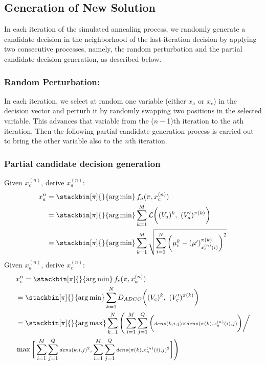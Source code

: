 \subsection{Generation of New Solution}
In each iteration of the simulated annealing process, we randomly generate a candidate decision in the neighborhood of the last-iteration decision by applying two consecutive processes, namely, the random perturbation and the partial candidate decision generation, as described below.
\subsubsection{Random Perturbation:} In each iteration, we select at random one variable (either $x_a$ or $x_c$) in the decision vector and perturb it by randomly swapping two positions in the selected variable. This advances that variable from the ($n-$1)th iteration to the $n$th iteration. Then the following partial candidate generation process is carried out to bring the other variable also to the $n$th iteration.
\subsubsection{Partial candidate decision generation}
\label{sec:new_sols}
Given $x_c^{(n)}$, derive $x_a^{(n)}$:
\begin{align}
\notag x_a^n&=\stackbin[\pi]{}{\argmin}\,f_a(\pi,x_c^{(n)})\\
\notag &=\stackbin[\pi]{}{\argmin}\sum_{k=1}^M\mathcal{L}\bigg((V_a)^k,~(V_a')^{\pi(k)}\bigg)\\
&=\stackbin[\pi]{}{\argmin}\sum_{k=1}^M\sqrt{\sum_{i=1}^N\bigg(\mu^{k}_i-(\mu')^{\pi(k)}_{x_c^{(n)}(i)}\bigg)^2} \label{eq:gen_xa}
\end{align}
Given $x_a^{(n)}$, derive $x_c^{(n)}$:
\begin{align}
\notag &x_c^n=\stackbin[\pi]{}{\argmin}\,f_c(\pi,x_a^{(n)})\\
\notag &=\stackbin[\pi]{}{\argmin}\sum_{k=1}^N D_{ADCO}\bigg((V_c)^k,~(V_c')^{\pi(k)}\bigg)\\
\notag &=\stackbin[\pi]{}{\argmax}\sum_{k=1}^N\Bigg(\displaystyle \sum_{i=1}^M\sum_{j=1}^Q \bigg({\scriptstyle dens(k,i,j)\times dens(\pi(k),x_a^{(n)}(i),j)}\bigg) \bigg/\\
&\max{\bigg[\sum_{i=1}^M\sum_{j=1}^Q {\scriptstyle dens(k,i,j)^2},\sum_{i=1}^M\sum_{j=1}^Q {\scriptstyle dens(\pi(k),x_a^{(n)}(i),j)^2}\bigg]}\Bigg) \label{eq:gen_xc}
\end{align}

